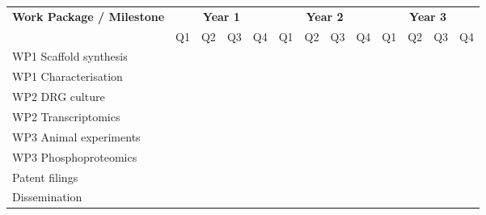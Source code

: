 \documentclass[11pt,a4paper]{article}
\begin{document}
\noindent
\begin{tabular}{@{}lcccccccccccc@{}}
\toprule
\rowcolor{ukriblue}
\color{white}\textbf{Work Package / Milestone} &
\multicolumn{4}{c}{\color{white}\textbf{Year 1}} &
\multicolumn{4}{c}{\color{white}\textbf{Year 2}} &
\multicolumn{4}{c}{\color{white}\textbf{Year 3}} \\
\rowcolor{ukriblue}
\color{white} &
\color{white}Q1 & \color{white}Q2 & \color{white}Q3 & \color{white}Q4 &
\color{white}Q1 & \color{white}Q2 & \color{white}Q3 & \color{white}Q4 &
\color{white}Q1 & \color{white}Q2 & \color{white}Q3 & \color{white}Q4 \\
\midrule
\rowcolor{ukrigray}
WP1 Scaffold synthesis &
\cellcolor{ukriblue!60} & \cellcolor{ukriblue!60} & \cellcolor{ukriblue!60} &
\cellcolor{ukriblue!60} & \cellcolor{ukriblue!60} & \cellcolor{ukriblue!60} &
 &  &  &  &  &  \\
\rowcolor{white}
WP1 Characterisation &
 & \cellcolor{ukriblue!40} & \cellcolor{ukriblue!40} & \cellcolor{ukriblue!40} &
\cellcolor{ukriblue!40} & \cellcolor{ukriblue!40} & \cellcolor{ukriblue!40} &
 &  &  &  &  \\
\rowcolor{ukrigray}
WP2 DRG culture &
 & \cellcolor{ukripink!50} & \cellcolor{ukripink!50} & \cellcolor{ukripink!50} &
\cellcolor{ukripink!50} & \cellcolor{ukripink!50} & \cellcolor{ukripink!50} &
\cellcolor{ukripink!50} &  &  &  &  \\
\rowcolor{white}
WP2 Transcriptomics &
 &  &  & \cellcolor{ukripink!40} & \cellcolor{ukripink!40} &
\cellcolor{ukripink!40} & \cellcolor{ukripink!40} & \cellcolor{ukripink!40} &
 &  &  &  \\
\rowcolor{ukrigray}
WP3 Animal experiments &
 &  &  &  &  &  & \cellcolor{ukricyan!60} & \cellcolor{ukricyan!60} &
\cellcolor{ukricyan!60} & \cellcolor{ukricyan!60} & \cellcolor{ukricyan!60} & \\
\rowcolor{white}
WP3 Phosphoproteomics &
 &  &  &  &  &  &  &  &
\cellcolor{ukricyan!40} & \cellcolor{ukricyan!40} & \cellcolor{ukricyan!40} & \\
\rowcolor{ukrigray}
Patent filings &
 &  &  &  &  & \cellcolor{ukripink!70} &  &  &  &  &
\cellcolor{ukripink!70} &  \\
\rowcolor{white}
Dissemination &
 &  &  &  &  &  &  & \cellcolor{ukriblue!30} &
\cellcolor{ukriblue!30} & \cellcolor{ukriblue!30} & \cellcolor{ukriblue!30} &
\cellcolor{ukriblue!30} \\
\bottomrule
\end{tabular}

\bigskip
\end{document}
